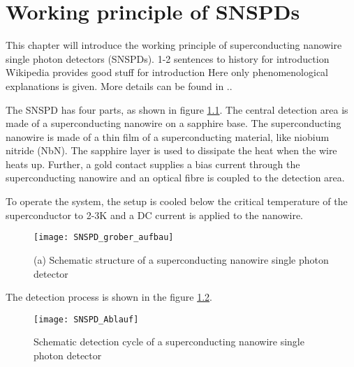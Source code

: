 \graphicspath{{/Users/maxim.re/Studium/Physik B.Sc./Semester_8_SS24/Proseminar/Figs Single Photon Detection/}}

\chapter{Working principle of SNSPDs}
\label{sec:SNSPD_working_principle}
This chapter will introduce the working principle of superconducting nanowire single photon detectors (SNSPDs).
1-2 sentences to history for introduction
Wikipedia provides good stuff for introduction
Here only phenomenological explanations is given. More details can be found in ..


The SNSPD has four parts, as shown in figure \ref{fig:SNSPD_rough_structure}.
The central detection area is made of a superconducting nanowire on a sapphire base.
The superconducting nanowire is made of a thin film of a superconducting material, like niobium nitride (NbN).
The sapphire layer is used to dissipate the heat when the wire heats up.
Further, a gold contact supplies a bias current through the superconducting nanowire and an optical fibre is coupled to the detection area.

To operate the system, the setup is cooled below the critical temperature of the superconductor to
2-3K and a DC current is applied to the nanowire.

\begin{figure}[hhh]
    \centering
    \texttt{[image: SNSPD\_grober\_aufbau]}
    \caption{(a) Schematic structure of a superconducting nanowire single photon detector \cite{steudle-2012}}
    \label{fig:SNSPD_rough_structure}
\end{figure}

The detection process is shown in the figure \ref{fig: SNSPD_process}.

\begin{figure}[hhh]
    \centering
    \texttt{[image: SNSPD\_Ablauf]}
    \caption{Schematic detection cycle of a superconducting nanowire single photon detector \cite{singlequantum_snsd_nodate}}
    \label{fig: SNSPD_process}
\end{figure}

